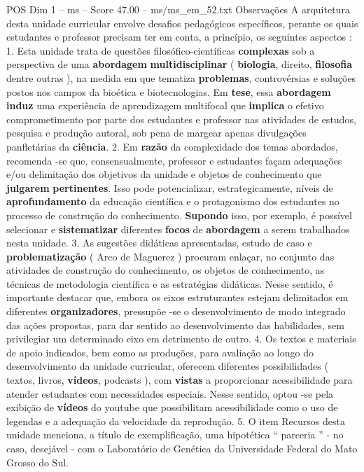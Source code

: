 \begin{textsample}{POS Dim 1 – ms – Score 47.00 – ms/ms\_em\_52.txt}
Observações A arquitetura desta unidade curricular envolve desafios pedagógicos específicos, perante os quais estudantes e professor precisam ter em conta, a princípio, os seguintes aspectos : 1.
Esta unidade trata de questões filosófico-científicas \textbf{complexas} sob a perspectiva de uma \textbf{abordagem} \textbf{multidisciplinar} ( \textbf{biologia}, direito, \textbf{filosofia} dentre outras ), na medida em que tematiza \textbf{problemas}, controvérsias e soluções postos nos campos da bioética e biotecnologias.
Em \textbf{tese}, essa \textbf{abordagem} \textbf{induz} uma experiência de aprendizagem multifocal que \textbf{implica} o efetivo comprometimento por parte dos estudantes e professor nas atividades de estudos, pesquisa e produção autoral, sob pena de margear apenas divulgações panfletárias da \textbf{ciência}. 2.
Em \textbf{razão} da complexidade dos temas abordados, recomenda -se que, consensualmente, professor e estudantes façam adequações e/ou delimitação dos objetivos da unidade e objetos de conhecimento que \textbf{julgarem} \textbf{pertinentes}.
Isso pode potencializar, estrategicamente, níveis de \textbf{aprofundamento} da educação científica e o protagonismo dos estudantes no processo de construção do conhecimento. \textbf{Supondo} isso, por exemplo, é possível selecionar e \textbf{sistematizar} diferentes \textbf{focos} de \textbf{abordagem} a serem trabalhados nesta unidade. 3.
As sugestões didáticas apresentadas, estudo de caso e \textbf{problematização} ( Arco de Maguerez ) procuram enlaçar, no conjunto das atividades de construção do conhecimento, os objetos de conhecimento, as técnicas de metodologia científica e as estratégias didáticas.
Nesse sentido, é importante destacar que, embora os eixos estruturantes estejam delimitados em diferentes \textbf{organizadores}, pressupõe -se o desenvolvimento de modo integrado das ações propostas, para dar sentido ao desenvolvimento das habilidades, sem privilegiar um determinado eixo em detrimento de outro. 4.
Os textos e materiais de apoio indicados, bem como as produções, para avaliação ao longo do desenvolvimento da unidade curricular, oferecem diferentes possibilidades ( textos, livros, \textbf{vídeos}, podcasts ), com \textbf{vistas} a proporcionar acessibilidade para atender estudantes com necessidades especiais.
Nesse sentido, optou -se pela exibição de \textbf{vídeos} do youtube que possibilitam acessibilidade como o uso de legendas e a adequação da velocidade da reprodução. 5.
O item Recursos desta unidade menciona, a título de exemplificação, uma hipotética “ parceria ” - no caso, desejável - com o Laboratório de Genética da Universidade Federal do Mato Grosso do Sul.

\end{textsample}
